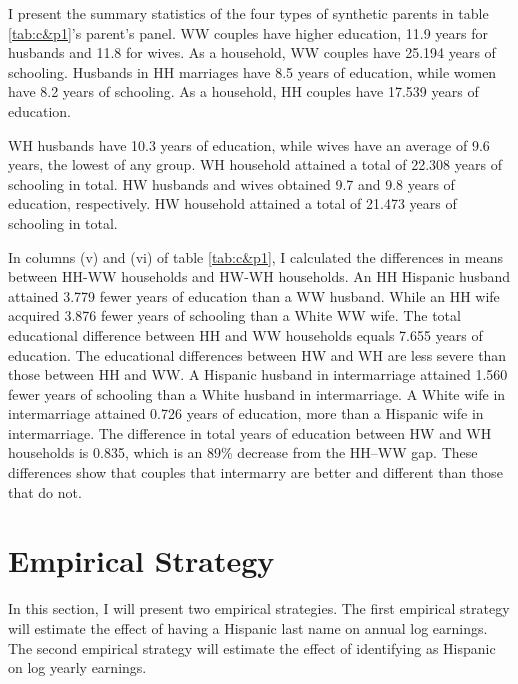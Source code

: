\documentclass{wptemp}
\begin{document}
I present the summary statistics of the four types of synthetic parents in table \ref{tab:c&p1}'s parent's panel. WW couples have higher education, 11.9 years for husbands and 11.8 for wives. As a household, WW couples have 25.194 years of schooling. Husbands in HH marriages have 8.5 years of education, while women have 8.2 years of schooling. As a household, HH couples have 17.539 years of education.

WH husbands have 10.3 years of education, while wives have an average of 9.6 years, the lowest of any group. WH household attained a total of 22.308 years of schooling in total. HW husbands and wives obtained 9.7 and 9.8 years of education, respectively. HW household attained a total of 21.473 years of schooling in total.

In columns (v) and (vi) of table \ref{tab:c&p1}, I calculated the differences in means between HH-WW households and HW-WH households. An HH Hispanic husband attained 3.779 fewer years of education than a WW husband. While an HH wife acquired 3.876 fewer years of schooling than a White WW wife. The total educational difference between HH and WW households equals 7.655 years of education. The educational differences between HW and WH are less severe than those between HH and WW. A Hispanic husband in intermarriage attained 1.560 fewer years of schooling than a White husband in intermarriage. A White wife in intermarriage attained 0.726 years of education, more than a Hispanic wife in intermarriage. The difference in total years of education between HW and WH households is 0.835, which is an 89\% decrease from the HH--WW gap. These differences show that couples that intermarry are better and different than those that do not.


\section{Empirical Strategy}\label{sec:emp_model}
In this section, I will present two empirical strategies. The first empirical strategy will estimate the effect of having a Hispanic last name on annual log earnings. The second empirical strategy will estimate the effect of identifying as Hispanic on log yearly earnings.
\end{document}
